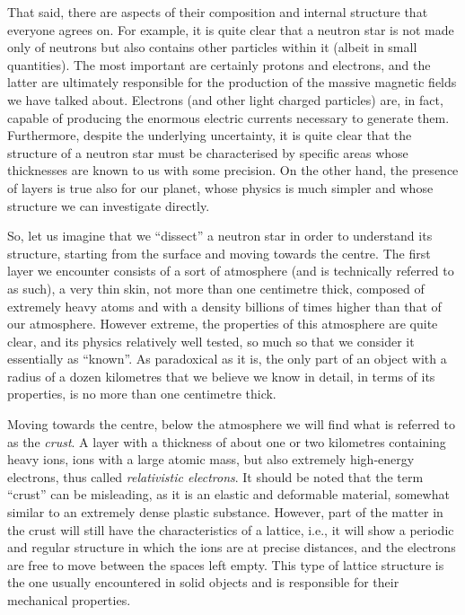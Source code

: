 That said, there are aspects of their composition and internal structure that everyone
agrees on. For example, it is quite clear that a neutron star is not made only of
neutrons but also contains other particles within it (albeit in small quantities). The
most important are certainly protons and electrons, and the latter are ultimately
responsible for the production of the massive magnetic fields we have talked about.
Electrons (and other light charged particles) are, in fact, capable of producing the
enormous electric currents necessary to generate them. Furthermore, despite the
underlying uncertainty, it is quite clear that the structure of a neutron star must be
characterised by specific areas whose thicknesses are known to us with some precision.
On the other hand, the presence of layers is true also for our planet, whose physics is
much simpler and whose structure we can investigate directly.

So, let us imagine that we ``dissect'' a neutron star in order to understand its
structure, starting from the surface and moving towards the centre.
The first layer we encounter consists of a sort of atmosphere (and is technically
referred to as such), a very thin skin, not more than one centimetre thick, composed of
extremely heavy atoms and with a density billions of times higher than that of our
atmosphere. However extreme, the properties of this atmosphere are quite clear, and its
physics relatively well tested, so much so that we consider it essentially as ``known''.
As paradoxical as it is, the only part of an object with a radius of a dozen kilometres
that we believe we know in detail, in terms of its properties, is no more than one
centimetre thick.

Moving towards the centre, below the atmosphere we will find what is referred to as the
\emph{crust}. A layer with a thickness of about one or two kilometres containing heavy
ions, ions with a large atomic mass, but also extremely high-energy
electrons, thus called \emph{relativistic electrons}. It should be
noted that the term ``crust'' can be misleading, as it is an elastic and deformable
material, somewhat similar to an extremely dense plastic substance. However, part of the
matter in the crust will still have the characteristics of a lattice, i.e., it will show
a periodic and regular structure in which the ions are at precise distances, and the
electrons are free to move between the spaces left empty. This type of lattice structure
is the one usually encountered in solid objects and is responsible for their mechanical
properties.

